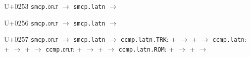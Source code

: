 \documentclass{article}
\begin{document}
\begin{substitutions}

U+0253  \linebreak
    \texttt{smcp.\textsc{dflt}} $\to$  \linebreak
    \texttt{smcp.latn} $\to$  

\goodbreak

U+0256  \linebreak
    \texttt{smcp.\textsc{dflt}} $\to$  \linebreak
    \texttt{smcp.latn} $\to$  

\goodbreak

U+0257  \linebreak
    \texttt{smcp.\textsc{dflt}} $\to$  \linebreak
    \texttt{smcp.latn} $\to$  \linebreak
\texttt{ccmp.latn.TRK}:
\linebreak\null\quad{} \space +  \space $\to$  
\linebreak\null\quad{} \space +  \space $\to$  
\linebreak
\texttt{ccmp.latn}:
\linebreak\null\quad{} \space +  \space $\to$  
\linebreak\null\quad{} \space +  \space $\to$  
\linebreak
\texttt{ccmp.\textsc{dflt}}:
\linebreak\null\quad{} \space +  \space $\to$  
\linebreak\null\quad{} \space +  \space $\to$  
\linebreak
\texttt{ccmp.latn.ROM}:
\linebreak\null\quad{} \space +  \space $\to$  
\linebreak\null\quad{} \space +  \space $\to$  


\goodbreak


\end{substitutions}
\end{document}
